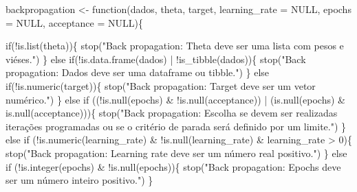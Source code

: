 \documentclass[
  a4paperpaper,
]{article}
\newenvironment{Shaded}{\begin{snugshade}}{\end{snugshade}}
\newcommand{\AttributeTok}[1]{\textcolor[rgb]{0.40,0.45,0.13}{#1}}
\newcommand{\ConstantTok}[1]{\textcolor[rgb]{0.56,0.35,0.01}{#1}}
\newcommand{\ControlFlowTok}[1]{\textcolor[rgb]{0.00,0.23,0.31}{#1}}
\newcommand{\DecValTok}[1]{\textcolor[rgb]{0.68,0.00,0.00}{#1}}
\newcommand{\FunctionTok}[1]{\textcolor[rgb]{0.28,0.35,0.67}{#1}}
\newcommand{\NormalTok}[1]{\textcolor[rgb]{0.00,0.23,0.31}{#1}}
\newcommand{\OtherTok}[1]{\textcolor[rgb]{0.00,0.23,0.31}{#1}}
\newcommand{\SpecialCharTok}[1]{\textcolor[rgb]{0.37,0.37,0.37}{#1}}
\newcommand{\StringTok}[1]{\textcolor[rgb]{0.13,0.47,0.30}{#1}}
\begin{document}
\begin{Shaded}
\begin{Highlighting}[]
\NormalTok{backpropagation }\OtherTok{\textless{}{-}} \ControlFlowTok{function}\NormalTok{(dados, theta, target, }\AttributeTok{learning\_rate =} \ConstantTok{NULL}\NormalTok{, }\AttributeTok{epochs =} \ConstantTok{NULL}\NormalTok{, }\AttributeTok{acceptance =} \ConstantTok{NULL}\NormalTok{)\{}
  
  \ControlFlowTok{if}\NormalTok{(}\SpecialCharTok{!}\FunctionTok{is.list}\NormalTok{(theta))\{}
    \FunctionTok{stop}\NormalTok{(}\StringTok{"Back propagation: Theta deve ser uma lista com pesos e viéses."}\NormalTok{)}
\NormalTok{  \} }\ControlFlowTok{else} \ControlFlowTok{if}\NormalTok{(}\SpecialCharTok{!}\FunctionTok{is.data.frame}\NormalTok{(dados) }\SpecialCharTok{|} \SpecialCharTok{!}\FunctionTok{is\_tibble}\NormalTok{(dados))\{}
    \FunctionTok{stop}\NormalTok{(}\StringTok{"Back propagation: Dados deve ser uma dataframe ou tibble."}\NormalTok{)}
\NormalTok{  \} }\ControlFlowTok{else} \ControlFlowTok{if}\NormalTok{(}\SpecialCharTok{!}\FunctionTok{is.numeric}\NormalTok{(target))\{}
    \FunctionTok{stop}\NormalTok{(}\StringTok{"Back propagation: Target deve ser um vetor numérico."}\NormalTok{)}
\NormalTok{  \} }\ControlFlowTok{else} \ControlFlowTok{if}\NormalTok{ ((}\SpecialCharTok{!}\FunctionTok{is.null}\NormalTok{(epochs) }\SpecialCharTok{\&} \SpecialCharTok{!}\FunctionTok{is.null}\NormalTok{(acceptance)) }\SpecialCharTok{|}\NormalTok{ (}\FunctionTok{is.null}\NormalTok{(epochs) }\SpecialCharTok{\&} \FunctionTok{is.null}\NormalTok{(acceptance)))\{}
    \FunctionTok{stop}\NormalTok{(}\StringTok{"Back propagation: Escolha se devem ser realizadas iterações programadas ou se o critério de parada será definido por um limite."}\NormalTok{)}
\NormalTok{  \} }\ControlFlowTok{else} \ControlFlowTok{if}\NormalTok{ (}\SpecialCharTok{!}\FunctionTok{is.numeric}\NormalTok{(learning\_rate) }\SpecialCharTok{\&} \SpecialCharTok{!}\FunctionTok{is.null}\NormalTok{(learning\_rate) }\SpecialCharTok{\&}\NormalTok{ learning\_rate }\SpecialCharTok{\textgreater{}} \DecValTok{0}\NormalTok{)\{}
    \FunctionTok{stop}\NormalTok{(}\StringTok{"Back propagation: Learning rate deve ser um número real positivo."}\NormalTok{)}
\NormalTok{  \} }\ControlFlowTok{else} \ControlFlowTok{if}\NormalTok{ (}\SpecialCharTok{!}\FunctionTok{is.integer}\NormalTok{(epochs) }\SpecialCharTok{\&} \SpecialCharTok{!}\FunctionTok{is.null}\NormalTok{(epochs))\{}
    \FunctionTok{stop}\NormalTok{(}\StringTok{"Back propagation: Epochs deve ser um número inteiro positivo."}\NormalTok{)}
\NormalTok{  \}}
  


\end{Highlighting}
\end{Shaded}
\end{document}
